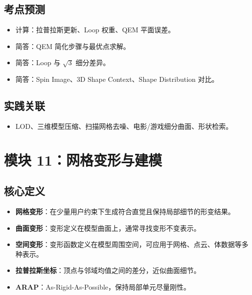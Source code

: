 \documentclass[UTF8,zihao=-4,scheme=chinese,fontset=fandol]{ctexart}
\newcommand{\key}[1]{\textbf{#1}}
\begin{document}
\subsection{考点预测}
\begin{itemize}
  \item 计算：拉普拉斯更新、Loop 权重、QEM 平面误差。
  \item 简答：QEM 简化步骤与最优点求解。
  \item 简答：Loop 与 $\sqrt3$ 细分差异。
  \item 简答：Spin Image、3D Shape Context、Shape Distribution 对比。
\end{itemize}

\subsection{实践关联}
\begin{itemize}
  \item LOD、三维模型压缩、扫描网格去噪、电影/游戏细分曲面、形状检索。
\end{itemize}

\section{模块 11：网格变形与建模}

\subsection{核心定义}
\begin{itemize}
  \item \key{网格变形}：在少量用户约束下生成符合直觉且保持局部细节的形变结果。
  \item \key{曲面变形}：变形定义在模型曲面上，通常寻找变形不变表示。
  \item \key{空间变形}：变形函数定义在模型周围空间，可应用于网格、点云、体数据等多种表示。
  \item \key{拉普拉斯坐标}：顶点与邻域均值之间的差分，近似曲面细节。
  \item \key{ARAP}：As-Rigid-As-Possible，保持局部单元尽量刚性。
\end{itemize}
\end{document}
